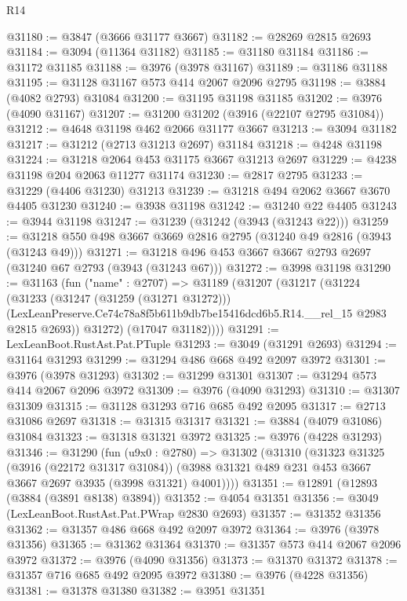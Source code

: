 \begin{lexlean}{R14}
\begin{coremodule}
@31180 := @3847 (@3666 @31177 @3667)
@31182 := @28269 @2815 @2693
@31184 := @3094 (@11364 @31182)
@31185 := @31180 @31184
@31186 := @31172 @31185
@31188 := @3976 (@3978 @31167)
@31189 := @31186 @31188
@31195 := @31128 @31167 @573 @414 @2067 @2096 @2795
@31198 := @3884 (@4082 @2793) @31084
@31200 := @31195 @31198 @31185
@31202 := @3976 (@4090 @31167)
@31207 := @31200 @31202 (@3916 (@22107 @2795 @31084))
@31212 := @4648 @31198 @462 @2066 @31177 @3667
@31213 := @3094 @31182
@31217 := @31212 (@2713 @31213 @2697) @31184
@31218 := @4248 @31198
@31224 := @31218 @2064 @453 @31175 @3667 @31213 @2697
@31229 := @4238 @31198 @204 @2063 @11277 @31174
@31230 := @2817 @2795
@31233 := @31229 (@4406 @31230) @31213
@31239 := @31218 @494 @2062 @3667 @3670 @4405 @31230
@31240 := @3938 @31198
@31242 := @31240 @22 @4405
@31243 := @3944 @31198
@31247 := @31239 (@31242 (@3943 (@31243 @22)))
@31259 := @31218 @550 @498 @3667 @3669 @2816 @2795 (@31240 @49 @2816 (@3943 (@31243 @49)))
@31271 := @31218 @496 @453 @3667 @3667 @2793 @2697 (@31240 @67 @2793 (@3943 (@31243 @67)))
@31272 := @3998 @31198
@31290 := @31163
    (fun ("name" : @2707) =>
    @31189
      (@31207
        (@31217
          (@31224
            (@31233
              (@31247 (@31259 (@31271 @31272)))
              (LexLeanPreserve.Ce74c78a8f5b611b9db7be15416dcd6b5.R14.__rel_15 @2983 @2815 @2693))
            @31272)
          (@17047 @31182))))
@31291 := LexLeanBoot.RustAst.Pat.PTuple
@31293 := @3049 (@31291 @2693)
@31294 := @31164 @31293
@31299 := @31294 @486 @668 @492 @2097 @3972
@31301 := @3976 (@3978 @31293)
@31302 := @31299 @31301
@31307 := @31294 @573 @414 @2067 @2096 @3972
@31309 := @3976 (@4090 @31293)
@31310 := @31307 @31309
@31315 := @31128 @31293 @716 @685 @492 @2095
@31317 := @2713 @31086 @2697
@31318 := @31315 @31317
@31321 := @3884 (@4079 @31086) @31084
@31323 := @31318 @31321 @3972
@31325 := @3976 (@4228 @31293)
@31346 := @31290
    (fun (u9x0 : @2780) =>
    @31302
      (@31310
        (@31323
          @31325
          (@3916 (@22172 @31317 @31084))
          (@3988 @31321 @489 @231 @453 @3667 @3667 @2697 @3935 (@3998 @31321) @4001))))
@31351 := @12891 (@12893 (@3884 (@3891 @8138) @3894))
@31352 := @4054 @31351
@31356 := @3049 (LexLeanBoot.RustAst.Pat.PWrap @2830 @2693)
@31357 := @31352 @31356
@31362 := @31357 @486 @668 @492 @2097 @3972
@31364 := @3976 (@3978 @31356)
@31365 := @31362 @31364
@31370 := @31357 @573 @414 @2067 @2096 @3972
@31372 := @3976 (@4090 @31356)
@31373 := @31370 @31372
@31378 := @31357 @716 @685 @492 @2095 @3972
@31380 := @3976 (@4228 @31356)
@31381 := @31378 @31380
@31382 := @3951 @31351

\end{coremodule}
\end{lexlean}
